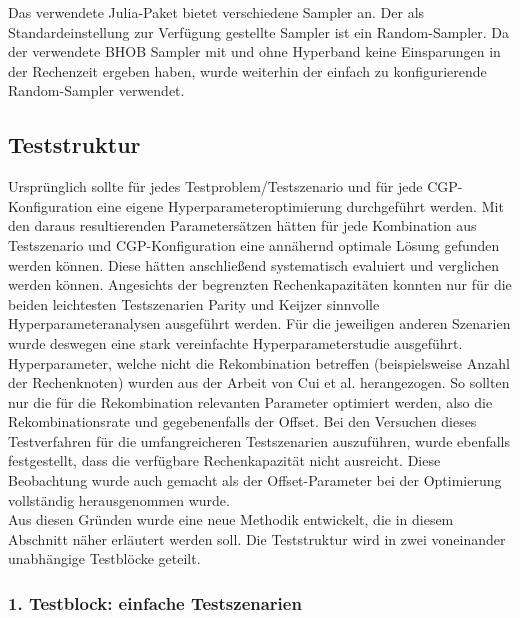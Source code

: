 Das verwendete Julia-Paket bietet verschiedene Sampler an.
Der als Standardeinstellung zur Verfügung gestellte Sampler ist ein Random-Sampler.
Da der verwendete BHOB Sampler mit und ohne Hyperband keine Einsparungen in der Rechenzeit ergeben haben, wurde weiterhin der einfach zu konfigurierende Random-Sampler verwendet. 

\subsection{Teststruktur}
\label{subsec:struktur}

Ursprünglich sollte für jedes Testproblem/Testszenario und für jede CGP-Konfiguration eine eigene Hyperparameteroptimierung durchgeführt werden.
Mit den daraus resultierenden Parametersätzen hätten für jede Kombination aus Testszenario und CGP-Konfiguration eine annähernd optimale Lösung gefunden werden können.
Diese hätten anschließend systematisch evaluiert und verglichen werden können.
Angesichts der begrenzten Rechenkapazitäten konnten nur für die beiden leichtesten Testszenarien Parity und Keijzer sinnvolle Hyperparameteranalysen ausgeführt werden.
Für die jeweiligen anderen Szenarien wurde deswegen eine stark vereinfachte Hyperparameterstudie ausgeführt.
Hyperparameter, welche nicht die Rekombination betreffen (beispielsweise Anzahl der Rechenknoten) wurden aus der Arbeit von Cui et al. \cite{cui_results} herangezogen.
So sollten nur die für die Rekombination relevanten Parameter optimiert werden, also die Rekombinationsrate und gegebenenfalls der Offset.
Bei den Versuchen dieses Testverfahren für die umfangreicheren Testszenarien auszuführen, wurde ebenfalls festgestellt, dass die verfügbare Rechenkapazität nicht ausreicht.
Diese Beobachtung wurde auch gemacht als der Offset-Parameter bei der Optimierung vollständig herausgenommen wurde.\\
Aus diesen Gründen wurde eine neue Methodik entwickelt, die in diesem Abschnitt näher erläutert werden soll.
Die Teststruktur wird in zwei voneinander unabhängige Testblöcke geteilt.

\subsubsection{1. Testblock: einfache Testszenarien}
\label{subsub:ersterTestblock}

